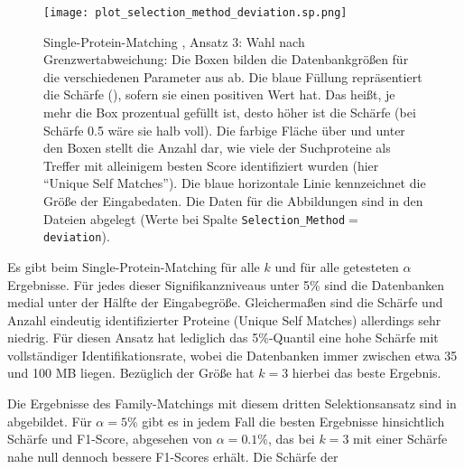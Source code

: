         \begin{figure}[H]
            \centering
            \texttt{[image: plot\_selection\_method\_deviation.sp.png]}
            \caption[Single-Protein-Matching , Ansatz 3: Wahl nach Grenzwertabweichung]{Single-Protein-Matching , Ansatz 3: Wahl nach Grenzwertabweichung: Die Boxen bilden die Datenbankgrößen für die verschiedenen Parameter aus  ab. Die blaue Füllung repräsentiert die Schärfe (), sofern sie einen positiven Wert hat. Das heißt, je mehr die Box prozentual gefüllt ist, desto höher ist die Schärfe (bei Schärfe 0.5 wäre sie halb voll). Die farbige Fläche über und unter den Boxen stellt die Anzahl dar, wie viele der Suchproteine als Treffer mit alleinigem besten Score identifiziert wurden (hier ``Unique Self Matches''). Die blaue horizontale Linie kennzeichnet die Größe der Eingabedaten. Die Daten für die Abbildungen sind in den Dateien  abgelegt (Werte bei Spalte \texttt{Selection\_Method}$=$\texttt{deviation}).}
            \label{fig:selection_method.deviation.sp}
        \end{figure}

        Es gibt beim Single-Protein-Matching für alle $k$ und für alle getesteten $\alpha$ Ergebnisse. Für jedes dieser Signifikanzniveaus unter 5\% sind die Datenbanken medial unter der Hälfte der Eingabegröße. Gleichermaßen sind die Schärfe und Anzahl eindeutig identifizierter Proteine (Unique Self Matches) allerdings sehr niedrig. Für diesen Ansatz hat lediglich das 5\%-Quantil eine hohe Schärfe mit vollständiger Identifikationsrate, wobei die Datenbanken immer zwischen etwa 35 und 100 \acs{MB} liegen. Bezüglich der Größe hat $k=3$ hierbei das beste Ergebnis.

        Die Ergebnisse des Family-Matchings mit diesem dritten Selektionsansatz sind in  abgebildet. Für $\alpha=5\%$ gibt es in jedem Fall die besten Ergebnisse hinsichtlich Schärfe und F1-Score, abgesehen von $\alpha=0.1\%$, das bei $k=3$ mit einer Schärfe nahe null dennoch bessere F1-Scores erhält. Die Schärfe der 

